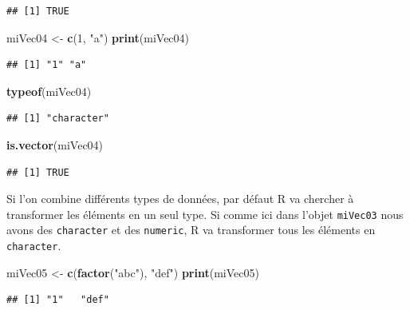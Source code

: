 \documentclass[]{book}
\newenvironment{Shaded}{\begin{snugshade}}{\end{snugshade}}
\newcommand{\DecValTok}[1]{\textcolor[rgb]{0.00,0.00,0.81}{#1}}
\newcommand{\KeywordTok}[1]{\textcolor[rgb]{0.13,0.29,0.53}{\textbf{#1}}}
\newcommand{\NormalTok}[1]{#1}
\newcommand{\StringTok}[1]{\textcolor[rgb]{0.31,0.60,0.02}{#1}}
\begin{document}
\begin{verbatim}
## [1] TRUE
\end{verbatim}

\begin{Shaded}
\begin{Highlighting}[]
\NormalTok{miVec04 <-}\StringTok{ }\KeywordTok{c}\NormalTok{(}\DecValTok{1}\NormalTok{, }\StringTok{"a"}\NormalTok{)}
\KeywordTok{print}\NormalTok{(miVec04)}
\end{Highlighting}
\end{Shaded}

\begin{verbatim}
## [1] "1" "a"
\end{verbatim}

\begin{Shaded}
\begin{Highlighting}[]
\KeywordTok{typeof}\NormalTok{(miVec04)}
\end{Highlighting}
\end{Shaded}

\begin{verbatim}
## [1] "character"
\end{verbatim}

\begin{Shaded}
\begin{Highlighting}[]
\KeywordTok{is.vector}\NormalTok{(miVec04)}
\end{Highlighting}
\end{Shaded}

\begin{verbatim}
## [1] TRUE
\end{verbatim}

Si l'on combine différents types de données, par défaut R va chercher à transformer les éléments en un seul type. Si comme ici dans l'objet \texttt{miVec03} nous avons des \texttt{character} et des \texttt{numeric}, R va transformer tous les éléments en \texttt{character}.

\begin{Shaded}
\begin{Highlighting}[]
\NormalTok{miVec05 <-}\StringTok{ }\KeywordTok{c}\NormalTok{(}\KeywordTok{factor}\NormalTok{(}\StringTok{"abc"}\NormalTok{), }\StringTok{"def"}\NormalTok{)}
\KeywordTok{print}\NormalTok{(miVec05)}
\end{Highlighting}
\end{Shaded}

\begin{verbatim}
## [1] "1"   "def"
\end{verbatim}
\end{document}
